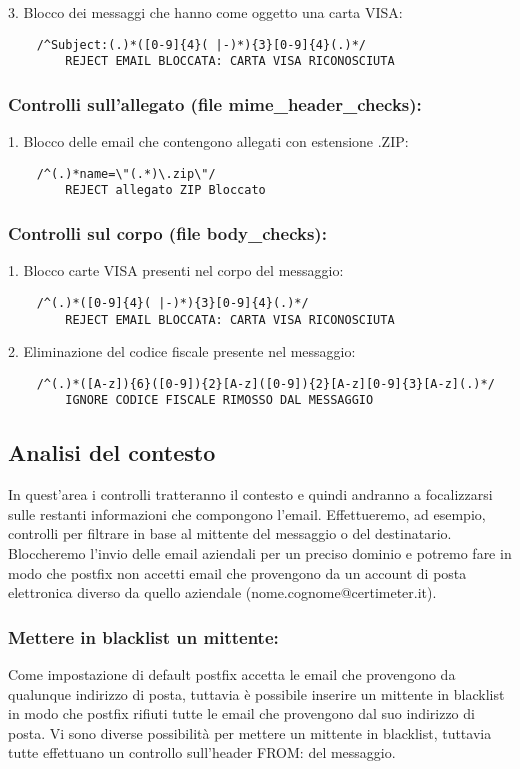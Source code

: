     3. Blocco dei messaggi che hanno come oggetto una carta VISA:
    \begin{verbatim}
    /^Subject:(.)*([0-9]{4}( |-)*){3}[0-9]{4}(.)*/
        REJECT EMAIL BLOCCATA: CARTA VISA RICONOSCIUTA
    \end{verbatim}


    \subsubsection{Controlli sull'allegato (file mime\_header\_checks):}

    1. Blocco delle email che contengono allegati con estensione .ZIP:

    \begin{verbatim}
    /^(.)*name=\"(.*)\.zip\"/
        REJECT allegato ZIP Bloccato
    \end{verbatim}

    \subsubsection{Controlli sul corpo (file body\_checks):}

    1. Blocco carte VISA presenti nel corpo del messaggio:
    \begin{verbatim}
    /^(.)*([0-9]{4}( |-)*){3}[0-9]{4}(.)*/
        REJECT EMAIL BLOCCATA: CARTA VISA RICONOSCIUTA
    \end{verbatim}
    2. Eliminazione del codice fiscale presente nel messaggio:
    \begin{verbatim}
    /^(.)*([A-z]){6}([0-9]){2}[A-z]([0-9]){2}[A-z][0-9]{3}[A-z](.)*/
        IGNORE CODICE FISCALE RIMOSSO DAL MESSAGGIO
    \end{verbatim}


    \subsection{Analisi del contesto}
    In quest’area i controlli tratteranno il contesto e quindi andranno a focalizzarsi sulle restanti 
    informazioni che compongono l’email. Effettueremo, ad esempio, controlli per filtrare in base al 
    mittente del messaggio o del destinatario. 
    Bloccheremo l’invio delle email aziendali per un preciso dominio e potremo fare in modo che postfix 
    non accetti email che provengono da un account di posta elettronica diverso da quello aziendale 
    (nome.cognome@certimeter.it). 

    \subsubsection{Mettere in blacklist un mittente:}
    Come impostazione di default postfix accetta le email che provengono da qualunque indirizzo di posta, 
    tuttavia è possibile inserire un mittente in blacklist in modo che postfix rifiuti tutte le email che 
    provengono dal suo indirizzo di posta. Vi sono diverse possibilità per mettere un mittente in blacklist, 
    tuttavia tutte effettuano un controllo sull’header FROM: del messaggio.


